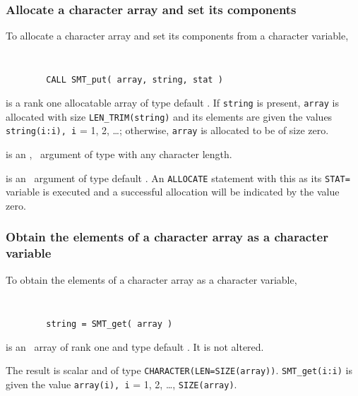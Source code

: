 \documentclass{galahad}
\begin{document}
\subsubsection{Allocate a character array and set its components}

To allocate a character array and set its components from a character variable,
\vspace*{-2mm}
{\tt
\begin{verbatim}
        CALL SMT_put( array, string, stat )
\end{verbatim}
}
\vspace*{-4mm}
\begin{description}

 is a rank one allocatable array of type default \character.
If {\tt string} is present, {\tt array} is allocated with size
{\tt LEN\_TRIM(string)} and
its elements are given the values {\tt string(i:i), i} = 1, 2, \ldots ;
otherwise, {\tt array} is allocated to be of size zero.

 is an \optional, \intentin\ argument of type \character
with any character length.

 is an
\intentout\ argument of type default \integer.
An {\tt ALLOCATE} statement with this as its {\tt STAT=}
variable is executed and a successful allocation will be indicated
by the value zero.
\end{description}

\subsubsection{Obtain the elements of a character array as a character variable}

To obtain the elements of a character array as a character variable,
\vspace*{-2mm}
{\tt
\begin{verbatim}
        string = SMT_get( array )
\end{verbatim}
}
\vspace*{-4mm}
\begin{description}

 is an \intentin\ array of rank one and type default \character.
It is not altered.
\end{description}
The result is scalar and of type {\tt CHARACTER(LEN=SIZE(array))}.
{\tt SMT\_get(i:i)} is given the value {\tt array(i), i} = 1, 2, \ldots ,
{\tt SIZE(array)}.
\end{document}
